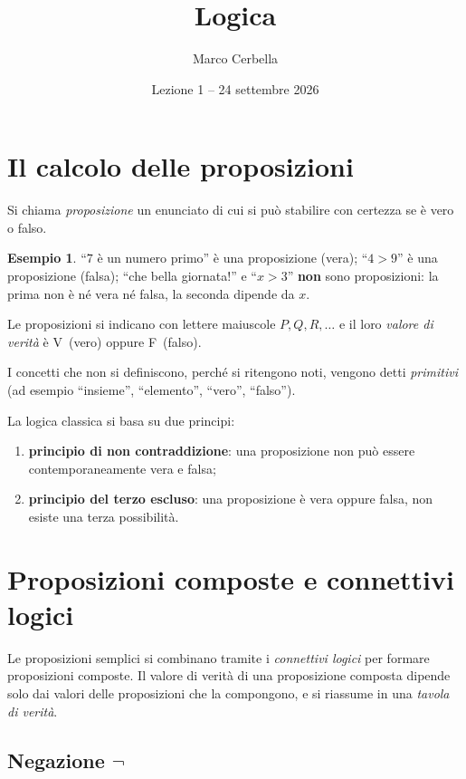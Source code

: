 \documentclass[11pt,a4paper]{article}
\title{Logica}
\author{Marco Cerbella}
\date{Lezione 1 -- 24 settembre 2026}
\theoremstyle{definition}
\newtheorem*{esempio}{Esempio}
\newcommand{\V}{\textsf{V}}
\newcommand{\F}{\textsf{F}}
\begin{document}
\maketitle

\section{Il calcolo delle proposizioni}

\begin{definizione}
Si chiama \emph{proposizione} un enunciato di cui si può stabilire con
certezza se è vero o falso.
\end{definizione}

\begin{esempio}
``$7$ è un numero primo'' è una proposizione (vera);
``$4 > 9$'' è una proposizione (falsa);
``che bella giornata!'' e ``$x > 3$'' \textbf{non} sono proposizioni:
la prima non è né vera né falsa, la seconda dipende da $x$.
\end{esempio}

Le proposizioni si indicano con lettere maiuscole $P, Q, R, \dots$ e il loro
\emph{valore di verità} è \V\ (vero) oppure \F\ (falso).

I concetti che non si definiscono, perché si ritengono noti, vengono detti
\emph{primitivi} (ad esempio ``insieme'', ``elemento'', ``vero'', ``falso'').

La logica classica si basa su due principi:
\begin{enumerate}
    \item \textbf{principio di non contraddizione}: una proposizione non può
          essere contemporaneamente vera e falsa;
    \item \textbf{principio del terzo escluso}: una proposizione è vera
          oppure falsa, non esiste una terza possibilità.
\end{enumerate}

\section{Proposizioni composte e connettivi logici}

Le proposizioni semplici si combinano tramite i \emph{connettivi logici}
per formare proposizioni composte. Il valore di verità di una proposizione
composta dipende solo dai valori delle proposizioni che la compongono, e si
riassume in una \emph{tavola di verità}.

\subsection{Negazione $\neg$}
\end{document}
